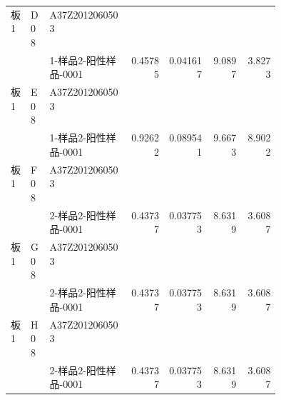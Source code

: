 \documentclass[UTF8,10pt,a4paper,fontset=fandol]{ctexart}
\newcommand{\fieldvalue}[1]{#1}
\begin{document}
\begin{small}
\begin{tabular}{p{0.07\linewidth}p{0.07\linewidth}p{0.30\linewidth}rrrr}
板1 & D08 & A37Z2012060503\\[-2pt]
    &     & 1-样品2-阳性样品-0001 &
\fieldvalue{0.45785} &
\fieldvalue{0.041617} &
\fieldvalue{9.0897} &
\fieldvalue{3.8273} \\

板1 & E08 & A37Z2012060503\\[-2pt]
    &     & 1-样品2-阳性样品-0001 &
\fieldvalue{0.92622} &
\fieldvalue{0.089541} &
\fieldvalue{9.6673} &
\fieldvalue{8.9022} \\

板1 & F08 & A37Z2012060503\\[-2pt]
    &     & 2-样品2-阳性样品-0001 &
\fieldvalue{0.43737} &
\fieldvalue{0.037753} &
\fieldvalue{8.6319} &
\fieldvalue{3.6087} \\

板1 & G08 & A37Z2012060503\\[-2pt]
    &     & 2-样品2-阳性样品-0001 &
\fieldvalue{0.43737} &
\fieldvalue{0.037753} &
\fieldvalue{8.6319} &
\fieldvalue{3.6087} \\

板1 & H08 & A37Z2012060503\\[-2pt]
    &     & 2-样品2-阳性样品-0001 &
\fieldvalue{0.43737} &
\fieldvalue{0.037753} &
\fieldvalue{8.6319} &
\fieldvalue{3.6087}
\end{tabular}
\end{small}

\bigskip
\end{document}
